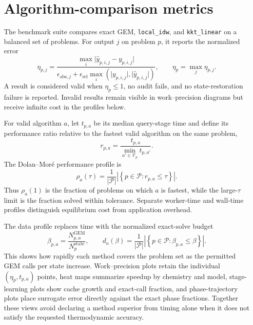 \documentclass[11pt]{article}
\newcommand{\code}[1]{\texttt{#1}}
\begin{document}
\section{Algorithm-comparison metrics}

The benchmark suite compares exact GEM, \code{local\_idw}, and \code{kkt\_linear} on a balanced
set of problems.  For output $j$ on problem $p$, it reports the normalized error
\begin{equation}
  \eta_{p,j} =
  \frac{
    \max_i \lvert \widehat y_{p,i,j} - y_{p,i,j} \rvert
  }{
    \epsilon_{\mathrm{abs},j}
    + \epsilon_{\mathrm{rel}}
      \max_i\left(\lvert y_{p,i,j}\rvert,
                  \lvert \widehat y_{p,i,j}\rvert\right)
  },
  \qquad
  \eta_p = \max_j \eta_{p,j}.
  \label{eq:benchmark-normalized-error}
\end{equation}
A result is considered valid when $\eta_p\leq 1$, no audit fails, and no state-restoration
failure is reported.  Invalid results remain visible in work--precision diagrams but receive
infinite cost in the profiles below.

For valid algorithm $a$, let $t_{p,a}$ be its median query-stage time and define its performance
ratio relative to the fastest valid algorithm on the same problem,
\begin{equation}
  r_{p,a} = \frac{t_{p,a}}{\min_{a'\in\mathcal V_p}t_{p,a'}}.
\end{equation}
The Dolan--Mor\'e performance profile is
\begin{equation}
  \rho_a(\tau) =
  \frac{1}{\lvert\mathcal P\rvert}
  \left\lvert
    \left\{p\in\mathcal P:r_{p,a}\leq\tau\right\}
  \right\rvert .
  \label{eq:performance-profile}
\end{equation}
Thus $\rho_a(1)$ is the fraction of problems on which $a$ is fastest, while the large-$\tau$
limit is the fraction solved within tolerance.  Separate worker-time and wall-time profiles
distinguish equilibrium cost from application overhead.

The data profile replaces time with the normalized exact-solve budget
\begin{equation}
  \beta_{p,a} =
  \frac{N^{\mathrm{GEM}}_{p,a}}{N^{\mathrm{state}}_p},
  \qquad
  d_a(\beta) =
  \frac{1}{\lvert\mathcal P\rvert}
  \left\lvert
    \left\{p\in\mathcal P:\beta_{p,a}\leq\beta\right\}
  \right\rvert .
  \label{eq:data-profile}
\end{equation}
This shows how rapidly each method covers the problem set as the permitted GEM calls per state
increase.  Work--precision plots retain the individual $(\eta_p,t_{p,a})$ points, heat maps
summarize speedup by chemistry and model, stage-learning plots show cache growth and exact-call
fraction, and phase-trajectory plots place surrogate error directly against the exact phase
fractions.  Together these views avoid declaring a method superior from timing alone when it
does not satisfy the requested thermodynamic accuracy.
\end{document}
